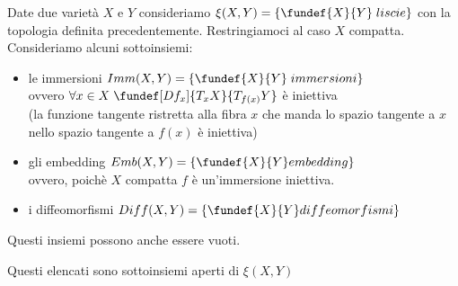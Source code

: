 

Date due varietà $X$ e $Y$ consideriamo $\xi(X,Y)=\{ \fundef{X}{Y} \; liscie \} $ con la topologia definita precedentemente. Restringiamoci al caso $X$ compatta.\\Consideriamo alcuni sottoinsiemi:
\begin{itemize}
\item le immersioni $Imm(X,Y) =\{\fundef{X}{Y} \; immersioni\}$\\ovvero $\forall x \in X \; \fundef[Df_x]{T_xX}{T_{f(x)}Y}$ è iniettiva \\(la funzione tangente ristretta alla fibra $x$ che manda lo spazio tangente a $x$ nello spazio tangente a $f(x)$ è iniettiva)
\item gli embedding $Emb(X,Y)=\{\fundef{X}{Y} embedding\}$\\ovvero, poichè $X$ compatta $f$ è un'immersione iniettiva.
\item i diffeomorfismi $Diff(X,Y)=\{\fundef{X}{Y} diffeomorfismi\}$
\end{itemize}

\begin{oss}
Questi insiemi possono anche essere vuoti.
\end{oss}

\begin{teo}
Questi elencati sono sottoinsiemi aperti di $\xi(X,Y)$
\end{teo}

